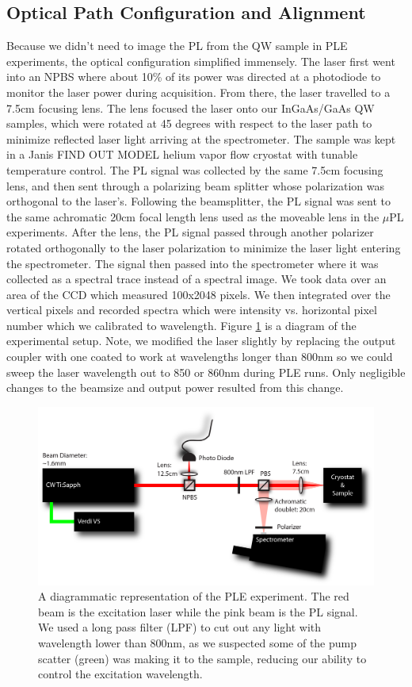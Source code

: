 \subsection{Optical Path Configuration and Alignment}
Because we didn't need to image the PL from the QW sample in PLE experiments, the optical configuration simplified immensely. The laser first went into an NPBS where about 10\% of its power was directed at a photodiode to monitor the laser power during acquisition. From there, the laser travelled to a 7.5cm focusing lens. The lens focused the laser onto our InGaAs/GaAs QW samples, which were rotated at 45 degrees with respect to the laser path to minimize reflected laser light arriving at the spectrometer. The sample was kept in a Janis FIND OUT MODEL helium vapor flow cryostat with tunable temperature control. The PL signal was collected by the same 7.5cm focusing lens, and then sent through a polarizing beam splitter whose polarization was orthogonal to the laser's. Following the beamsplitter, the PL signal was sent to the same achromatic 20cm focal length lens used as the moveable lens in the $\mu$PL experiments. After the lens, the PL signal passed through another polarizer rotated orthogonally to the laser polarization to minimize the laser light entering the spectrometer. The signal then passed into the spectrometer where it was collected as a spectral trace instead of a spectral image. We took data over an area of the CCD which measured 100x2048 pixels. We then integrated over the vertical pixels and recorded spectra which were intensity vs. horizontal pixel number which we calibrated to wavelength. Figure \ref{PLE} is a diagram of the experimental setup. Note, we modified the laser slightly by replacing the output coupler with one coated to work at wavelengths longer than 800nm so we could sweep the laser wavelength out to 850 or 860nm during PLE runs. Only negligible changes to the beamsize and output power resulted from this change.

\begin{figure}[h!]
\centering
\includegraphics[width = 1\textwidth]{PLE.png}
\caption{ \doublespacing A diagrammatic representation of the PLE experiment. The red beam is the excitation laser while the pink beam is the PL signal. We used a long pass filter (LPF) to cut out any light with wavelength lower than 800nm, as we suspected some of the pump scatter (green) was making it to the sample, reducing our ability to control the excitation wavelength.}
\label{PLE}
\end{figure}

